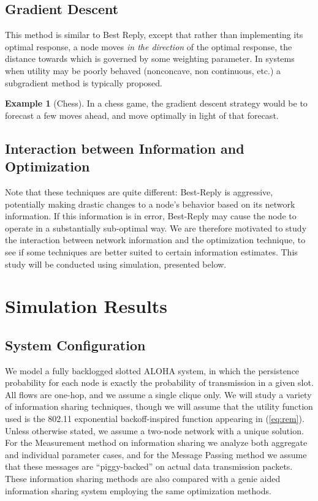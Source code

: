 \documentclass[11pt]{IEEEtran}
\theoremstyle{definition}
\newtheorem{example}{Example}
\begin{document}
\subsection{Gradient Descent}
This method is similar to Best Reply, except that rather than implementing its optimal response, a node moves \emph{in the direction} of the optimal response, the distance towards which is governed by some weighting parameter. In systems when utility may be poorly behaved (nonconcave, non continuous, etc.) a subgradient method is typically proposed.

\begin{example}[Chess]
In a chess game, the gradient descent strategy would be to
forecast a few moves ahead, and move optimally in light of that forecast.
\end{example}

\subsection{Interaction between Information and Optimization}
Note that these techniques are quite different: Best-Reply is aggressive,
potentially making drastic changes to a node's behavior based on its network
information.  If this information is in error, Best-Reply may cause the node to
operate in a substantially sub-optimal way.  We are therefore motivated to
study the interaction between network information and the optimization
technique, to see if some techniques are better suited to certain information
estimates.  This study will be conducted using simulation, presented below.

\section{Simulation Results}
\subsection{System Configuration}

We model a fully backlogged slotted ALOHA system, in which the persistence probability for each node is exactly the probability of transmission in a given slot.  All flows are one-hop, and we assume a single clique only.  We will study a variety of information sharing techniques, though we will assume that the utility function used is the 802.11 exponential backoff-inspired function appearing in (\ref{eq:rem}).  Unless otherwise stated, we assume a two-node network with a unique solution. For the Measurement method on information sharing we analyze both aggregate and individual parameter cases, and for the Message Passing method we assume that these messages are ``piggy-backed'' on actual data transmission packets. These information sharing methods are also compared with a genie aided information sharing system employing the same optimization methods.
\end{document}
